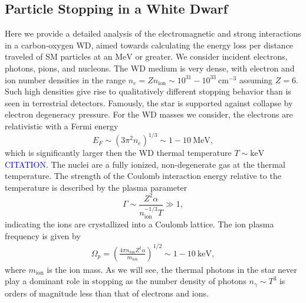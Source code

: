 \documentclass[twocolumn, preprintnumbers,amsmath,amssymb,prd, superscriptaddress]{revtex4}
\newcommand{\MeV}{\text{MeV}}
\newcommand{\keV}{\text{keV}}
\newcommand{\cm}{\text{cm}}
\def\r{\right)}
\def\l{\left(}
\begin{document}
\begin{appendices}

\section{Particle Stopping in a White Dwarf}
\label{sec:Appendix}
Here we provide a detailed analysis of the electromagnetic and strong interactions in a carbon-oxygen WD, aimed towards calculating the energy loss per distance traveled of SM particles at an $\text{MeV}$ or greater.
We consider incident electrons, photons, pions, and nucleons.
The WD medium is very dense, with electron and ion number densities in the range $n_e = Z n_\text{ion} \sim 10^{31} - 10^{33} ~\cm^{-3}$ assuming $Z=6$.
Such high densities give rise to qualitatively different stopping behavior than is seen in terrestrial detectors.
Famously, the star is supported against collapse by electron degeneracy pressure.
For the WD masses we consider, the electrons are relativistic with a Fermi energy
\begin{equation}
  E_F \sim (3 \pi^2 n_e)^{1/3} \sim 1 -10 ~\MeV,
\end{equation}
which is significantly larger then the WD thermal temperature $T \sim \keV$ \textcolor{blue}{CITATION}.
The nuclei are a fully ionized, non-degenerate gas at the thermal temperature.
The strength of the Coulomb interaction energy relative to the temperature is described by the plasma parameter
\begin{equation}
\label{eq:lattice}
 \Gamma \sim \frac{Z^2 \alpha}{n_\text{ion}^{-1/3}T} \gg 1,
\end{equation}
indicating the ions are crystallized into a Coulomb lattice.
The ion plasma frequency is given by
\begin{align}
\Omega_p = \l \frac{4 \pi n_\text{ion} Z^2 \alpha}{m_\text{ion}}\r^{1/2} \sim 1 - 10~\text{keV},
\end{align}
where $m_\text{ion}$ is the ion mass.
As we will see, the thermal photons in the star never play a dominant role in stopping as the number density of photons $n_\gamma \sim T^3$ is orders of magnitude less than that of electrons and ions.




\end{appendices}
\end{document}
